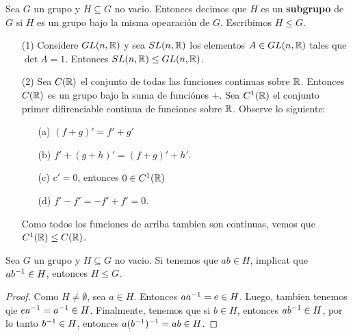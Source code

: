 \begin{definition}
    Sea $G$ un grupo y  $H \subseteq G$ no vacio. Entonces decimos que  $H$ es
    un  \textbf{subgrupo} de $G$ si  $H$ es un grupo bajo la misma opearaci\'on
    de  $G$. Escribimos  $H \leq G$.
\end{definition}

\begin{example}\label{}
    \begin{enumerate}
        \item[(1)] Considere $GL(n,\mathbb{R})$ y sea $SL(n,\mathbb{R})$ los elementos $A \in
           GL(n,\mathbb{R})$ tales que $\det{A}=1$. Entonces $SL(n,\mathbb{R}) \leq GL(n,\mathbb{R})$.

       \item[(2)] Sea $C(\mathbb{R})$ el conjunto de todas las funciones continuas sobre
           $\mathbb{R}$. Entonces  $C(\mathbb{R})$ es un grupo bajo la suma de funci\'ones $+$.
           Sea $C^1(\mathbb{R})$ el conjunto primer difirenciable continua de funciones
           sobre $\mathbb{R}$. Observe lo siguiente:
           \begin{enumerate}
               \item[(a)] $(f+g)'=f'+g'$
               \item[(b)] $f'+(g+h)'=(f+g)'+h'$.
               \item[(c)] $c'=0$, entonces $0 \in C^1(\mathbb{R})$
               \item[(d)] $f'-f'=-f'+f'=0$.
           \end{enumerate}
           Como todos los funciones de arriba tambien son continuas, vemos que
           $C^1(\mathbb{R}) \leq C(\mathbb{R})$.
    \end{enumerate}
\end{example}

\begin{lemma}\label{}
    Sea $G$ un grupo y  $H \subseteq G$ no vacio. Si tenemos que $ab \in H$,
    implicat que $ab^{-1} \in H$, entonces $H \leq G$.
\end{lemma}
\begin{proof}
    Como $H \neq \emptyset$, sea  $a \in H$. Entonces $aa^{-1}=e \in H$. Luego,
    tambien tenemos qie $ea^{-1}=a^{-1} \in H$. Finalmente, tenemos que si $b
    \in H$, entonces  $ab^{-1} \in H$, por lo tanto $b^{-1} \in H$, entonces
    $a(b^{-1})^{-1}=ab \in H$.
\end{proof}

